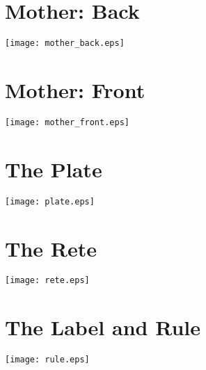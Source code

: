 \documentclass[a4paper,onecolumn,10pt]{article}
\begin{document}
\newpage
\section*{Mother: Back}
\label{mother_back}
\vspace{-1cm}\centerline{\texttt{[image: mother\_back.eps]}}
\section*{Mother: Front}
\label{mother_front}
\vspace{-1cm}\centerline{\texttt{[image: mother\_front.eps]}}
\section*{The Plate}
\label{plate}
\vspace{1.5cm}\centerline{\texttt{[image: plate.eps]}}
\section*{The Rete}
\label{rete}
\vspace{1.5cm}\centerline{\texttt{[image: rete.eps]}}
\section*{The Label and Rule}
\label{rule}
\centerline{\texttt{[image: rule.eps]}}
\end{document}
